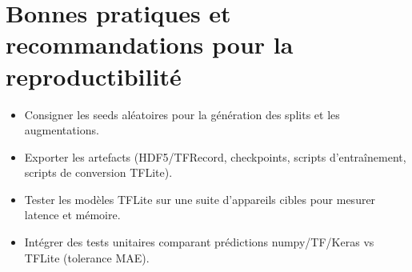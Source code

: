 

\section{Bonnes pratiques et recommandations pour la reproductibilité}

\begin{itemize}
	\item Consigner les seeds aléatoires pour la génération des splits et les augmentations.
	\item Exporter les artefacts (HDF5/TFRecord, checkpoints, scripts d'entraînement, scripts de conversion TFLite).
	\item Tester les modèles TFLite sur une suite d'appareils cibles pour mesurer latence et mémoire.
	\item Intégrer des tests unitaires comparant prédictions numpy/TF/Keras vs TFLite (tolerance MAE).
\end{itemize}

